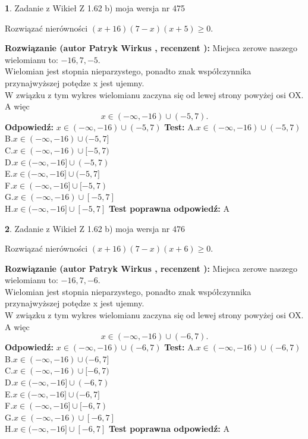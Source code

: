 \documentclass[12pt, a4paper]{article}
\theoremstyle{definition} %
\newtheorem{zad}{}
\newcommand{\zadStart}[1]{\begin{zad}#1\newline}
\newcommand{\zadStop}{\end{zad}}
\newcommand{\rozwStart}[2]{\noindent \textbf{Rozwiązanie (autor #1 , recenzent #2): }\newline}
\newcommand{\rozwStop}{\newline}
\newcommand{\odpStart}{\noindent \textbf{Odpowiedź:}\newline}
\newcommand{\odpStop}{\newline}
\newcommand{\testStart}{\noindent \textbf{Test:}\newline}
\newcommand{\testStop}{\newline}
\newcommand{\kluczStart}{\noindent \textbf{Test poprawna odpowiedź:}\newline}
\newcommand{\kluczStop}{\newline}
\begin{document}
\zadStart{Zadanie z Wikieł Z 1.62 b) moja wersja nr 475}

Rozwiązać nierówności $(x+16)(7-x)(x+5)\ge0$.
\zadStop
\rozwStart{Patryk Wirkus}{}
Miejsca zerowe naszego wielomianu to: $-16, 7, -5$.\\
Wielomian jest stopnia nieparzystego, ponadto znak współczynnika przy\linebreak najwyższej potędze x jest ujemny.\\ W związku z tym wykres wielomianu zaczyna się od lewej strony powyżej osi OX. A więc $$x \in (-\infty,-16) \cup (-5,7).$$
\rozwStop
\odpStart
$x \in (-\infty,-16) \cup (-5,7)$
\odpStop
\testStart
A.$x \in (-\infty,-16) \cup (-5,7)$\\
B.$x \in (-\infty,-16) \cup (-5,7]$\\
C.$x \in (-\infty,-16) \cup [-5,7)$\\
D.$x \in (-\infty,-16] \cup (-5,7)$\\
E.$x \in (-\infty,-16] \cup (-5,7]$\\
F.$x \in (-\infty,-16] \cup [-5,7)$\\
G.$x \in (-\infty,-16) \cup [-5,7]$\\
H.$x \in (-\infty,-16] \cup [-5,7]$
\testStop
\kluczStart
A
\kluczStop



\zadStart{Zadanie z Wikieł Z 1.62 b) moja wersja nr 476}

Rozwiązać nierówności $(x+16)(7-x)(x+6)\ge0$.
\zadStop
\rozwStart{Patryk Wirkus}{}
Miejsca zerowe naszego wielomianu to: $-16, 7, -6$.\\
Wielomian jest stopnia nieparzystego, ponadto znak współczynnika przy\linebreak najwyższej potędze x jest ujemny.\\ W związku z tym wykres wielomianu zaczyna się od lewej strony powyżej osi OX. A więc $$x \in (-\infty,-16) \cup (-6,7).$$
\rozwStop
\odpStart
$x \in (-\infty,-16) \cup (-6,7)$
\odpStop
\testStart
A.$x \in (-\infty,-16) \cup (-6,7)$\\
B.$x \in (-\infty,-16) \cup (-6,7]$\\
C.$x \in (-\infty,-16) \cup [-6,7)$\\
D.$x \in (-\infty,-16] \cup (-6,7)$\\
E.$x \in (-\infty,-16] \cup (-6,7]$\\
F.$x \in (-\infty,-16] \cup [-6,7)$\\
G.$x \in (-\infty,-16) \cup [-6,7]$\\
H.$x \in (-\infty,-16] \cup [-6,7]$
\testStop
\kluczStart
A
\kluczStop
\end{document}
